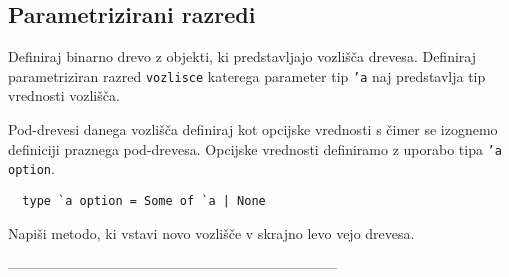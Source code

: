 \subsection{Parametrizirani razredi}

\begin{ex}
  Definiraj binarno drevo z objekti, ki predstavljajo vozli\v s\v
  ca drevesa. Definiraj parametriziran razred \texttt{vozlisce}
  katerega parameter tip \texttt{'a} naj predstavlja tip vrednosti
  vozli\v s\v ca.

  Pod-drevesi danega vozli\v s\v ca definiraj kot opcijske vrednosti s
  \v cimer se izognemo definiciji praznega pod-drevesa. Opcijske
  vrednosti definiramo z uporabo tipa \texttt{'a option}.

  \begin{verbatim}
  type `a option = Some of `a | None
  \end{verbatim}

  Napi\v si metodo, ki vstavi novo vozli\v s\v ce v skrajno levo vejo
  drevesa.


\end{ex} 



-----------------------------------------------------------------------


